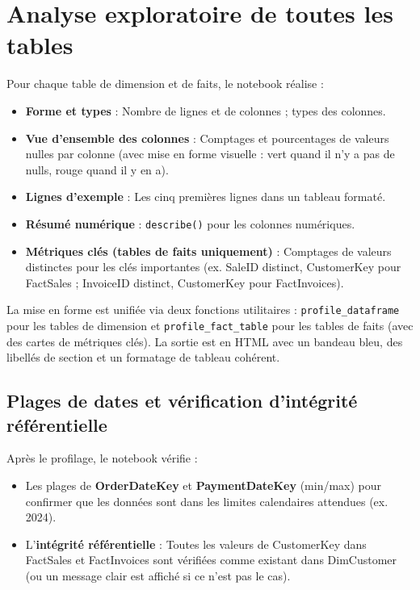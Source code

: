 \documentclass[11pt,a4paper]{article}
\begin{document}
\section{Analyse exploratoire de toutes les tables}

Pour chaque table de dimension et de faits, le notebook réalise :
\begin{itemize}[noitemsep]
  \item \textbf{Forme et types} : Nombre de lignes et de colonnes ; types des colonnes.
  \item \textbf{Vue d'ensemble des colonnes} : Comptages et pourcentages de valeurs nulles par colonne (avec mise en forme visuelle : vert quand il n'y a pas de nulls, rouge quand il y en a).
  \item \textbf{Lignes d'exemple} : Les cinq premières lignes dans un tableau formaté.
  \item \textbf{Résumé numérique} : \texttt{describe()} pour les colonnes numériques.
  \item \textbf{Métriques clés (tables de faits uniquement)} : Comptages de valeurs distinctes pour les clés importantes (ex. SaleID distinct, CustomerKey pour FactSales ; InvoiceID distinct, CustomerKey pour FactInvoices).
\end{itemize}

La mise en forme est unifiée via deux fonctions utilitaires : \texttt{profile\_dataframe} pour les tables de dimension et \texttt{profile\_fact\_table} pour les tables de faits (avec des cartes de métriques clés). La sortie est en HTML avec un bandeau bleu, des libellés de section et un formatage de tableau cohérent.

\subsection{Plages de dates et vérification d'intégrité référentielle}

Après le profilage, le notebook vérifie :
\begin{itemize}[noitemsep]
  \item Les plages de \textbf{OrderDateKey} et \textbf{PaymentDateKey} (min/max) pour confirmer que les données sont dans les limites calendaires attendues (ex. 2024).
  \item L'\textbf{intégrité référentielle} : Toutes les valeurs de CustomerKey dans FactSales et FactInvoices sont vérifiées comme existant dans DimCustomer (ou un message clair est affiché si ce n'est pas le cas).
\end{itemize}
\end{document}
